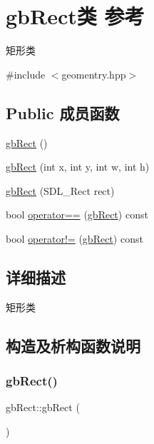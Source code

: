 \hypertarget{classgb_rect}{}\section{gb\+Rect类 参考}
\label{classgb_rect}


矩形类  




{\ttfamily \#include $<$geomentry.\+hpp$>$}

\subsection*{Public 成员函数}
\begin{DoxyCompactItemize}
\item 
\mbox{\hyperlink{classgb_rect_a92bc23d7f814473c95c10e55b5b36887}{gb\+Rect}} ()
\item 
\mbox{\hyperlink{classgb_rect_ad87d8d116e21198f08bdcffdbbe6361f}{gb\+Rect}} (int x, int y, int w, int h)
\item 
\mbox{\hyperlink{classgb_rect_ad2320622e9b449ec70dc99fd206ba3cf}{gb\+Rect}} (S\+D\+L\+\_\+\+Rect rect)
\item 
bool \mbox{\hyperlink{classgb_rect_ab64eca7f0aa12098783fa406e61ded56}{operator==}} (\mbox{\hyperlink{classgb_rect}{gb\+Rect}}) const
\item 
bool \mbox{\hyperlink{classgb_rect_af45d974ddde70f8f20dfda8253cbf9ed}{operator!=}} (\mbox{\hyperlink{classgb_rect}{gb\+Rect}}) const
\end{DoxyCompactItemize}


\subsection{详细描述}
矩形类 

\subsection{构造及析构函数说明}
\mbox{\label{classgb_rect_a92bc23d7f814473c95c10e55b5b36887}} 
\subsubsection{\texorpdfstring{gbRect()}{gbRect()}\hspace{0.1cm}{\footnotesize\ttfamily [1/3]}}
{\footnotesize\ttfamily gb\+Rect\+::gb\+Rect (\begin{DoxyParamCaption}{ }\end{DoxyParamCaption})}

